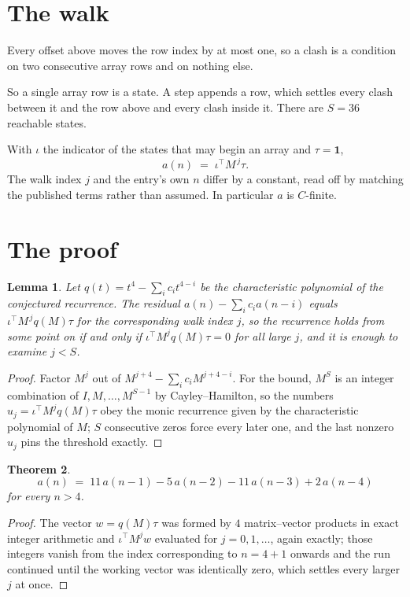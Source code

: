 \documentclass[11pt,a4paper]{article}
\theoremstyle{plain}
\newtheorem{theorem}{Theorem}
\newtheorem{lemma}[theorem]{Lemma}
\theoremstyle{definition}
\begin{document}
\section{The walk}

Every offset above moves the row index by at most one, so a clash is a condition on two
consecutive array rows and on nothing else.

So a single array row is a state. A step appends a row, which settles every clash between it
and the row above and every clash inside it. There are $S=36$ reachable states.

With $\iota$ the indicator of the states that may begin an array and $\tau=\mathbf{1}$,
\[
a(n)\;=\;\iota^{\!\top}M^{\,j}\tau .
\]
The walk index $j$ and the entry's own $n$ differ by a constant, read off by matching the
published terms rather than assumed. In particular $a$ is $C$-finite.

\section{The proof}

\begin{lemma}\label{lem:crit}
Let $q(t)=t^{4}-\sum_i c_it^{4-i}$ be the characteristic polynomial of the
conjectured recurrence. The residual $a(n)-\sum_ic_ia(n-i)$ equals
$\iota^{\!\top}M^{\,j}q(M)\tau$ for the corresponding walk index $j$, so the recurrence
holds from some point on if and only if $\iota^{\!\top}M^{j}q(M)\tau=0$ for all large $j$,
and it is enough to examine $j<S$.
\end{lemma}

\begin{proof}
Factor $M^{j}$ out of $M^{j+4}-\sum_ic_iM^{j+4-i}$. For the bound, $M^{S}$
is an integer combination of $I,M,\dots,M^{S-1}$ by Cayley--Hamilton, so the numbers
$u_j=\iota^{\!\top}M^{j}q(M)\tau$ obey the monic recurrence given by the characteristic
polynomial of $M$; $S$ consecutive zeros force every later one, and the last nonzero $u_j$
pins the threshold exactly.
\end{proof}

\begin{theorem}
\[
a(n)\;=\;11\,a(n-1) - 5\,a(n-2) - 11\,a(n-3) + 2\,a(n-4)
\]
for every $n>4$.
\end{theorem}

\begin{proof}
The vector $w=q(M)\tau$ was formed by $4$ matrix--vector products in exact integer
arithmetic and $\iota^{\!\top}M^{j}w$ evaluated for $j=0,1,\dots$, again exactly; those
integers vanish from the index corresponding to $n=4+1$ onwards and the run continued
until the working vector was identically zero, which settles every larger $j$ at once.
\end{proof}
\end{document}
